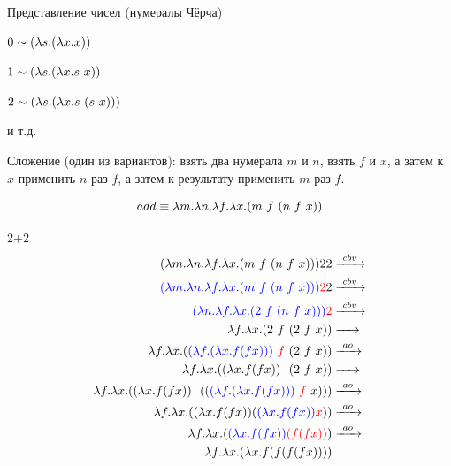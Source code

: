 \begin{frame}{Представление чисел (нумералы Чёрча)}

$ 0 \sim (\lambda s . (\lambda x . x))$

$ 1 \sim (\lambda s . (\lambda x . s\ x))$

$ 2 \sim \lam{s}{\lam{x}{s\ (s\ x)}}$

  и т.д.
  \vspace{1cm}

  Сложение (один из вариантов): взять два нумерала $m$ и $n$, взять $f$ и $x$, а затем к $x$ применить $n$ раз $f$, а затем к результату применить $m$ раз $f$.

  \[
  add \equiv \lambda m. \lambda n. \lambda f. \lambda x. (m\ f\  (n\ f\  x))
  \]
\end{frame}
\newcommand{\tb}[1]{\textcolor{blue}{#1}}
\newcommand{\tr}[1]{\textcolor{red}{#1}}
\begin{frame}{2+2}
  \begin{align*}
    (\lambda m. \lambda n. \lambda f. \lambda x. \app{m\ f\ }{\app{n\ f\ }{x}}){} 2 2 &\cbv \\
    \textcolor{blue}{(\lambda m. \lambda n. \lambda f. \lambda x. \app{m\ f\ }{\app{n\ f\ }{x}}) {}} \textcolor{red}{2} 2 &\cbv \\
    \textcolor{blue}{( \lambda n. \lambda f. \lambda x. \app{2\ f\ }{\app{n\ f\ }{x}}){}} \textcolor{red}{2} & \cbv \\
    \lambda f. \lambda x. \app{2\ f\ }{\app{2\ f\ }{x}}   &\xarr{\ \ } \\
    \lambda f. \lambda x. \app{\tb{\lam{f}{\lam{x}{f (f x)}}} \ \tr{f}\ }{\app{2\ f\ }{x}} &\ao \\
    \lambda f. \lambda x. \app{\lam{x}{f (f x)} \ \ }{\app{2\ f\ }{x}} &\xarr{\ \ } \\
    \lambda f. \lambda x. \app{\lam{x}{f (f x)} \ \ } {\app{\app{\tb{\lam{f}{\lam{x}{f (f x)}}}\ \tr{f}\ }{x}}} &\ao \\
    \lambda f. \lambda x. \app{\lam{x}{f (f x)}  } {\app{\tb{\lam{x}{f (f x)} } }{\tr{x}}} &\ao \\
    \lambda f. \lambda x. \app{\tb{\lam{x}{f (f x)} } } {\tr{(f (f x))}} &\ao \\
    \lambda f. \lambda x. \lam{x}{f (f (f (f x)))} &
  \end{align*}
\end{frame}


